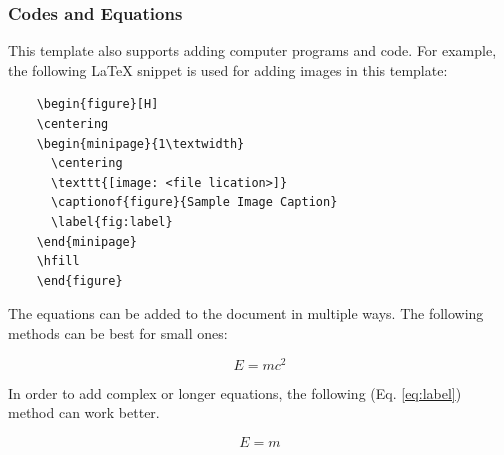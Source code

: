 \subsubsection{Codes and Equations}

This template also supports adding computer programs and code. For example, the following \LaTeX \cite{goossens1994latex} snippet is used for adding images in this template: \\

\begin{lstlisting}
    \begin{figure}[H]
    \centering
    \begin{minipage}{1\textwidth}
      \centering
      \texttt{[image: <file lication>]}
      \captionof{figure}{Sample Image Caption}
      \label{fig:label}
    \end{minipage}
    \hfill
    \end{figure}
\end{lstlisting}


The equations can be added to the document in multiple ways. The following methods can be best for small ones:

\[E=mc^2\]

In order to add complex or longer equations, the following (Eq. \ref{eq:label}) method can work better.

\begin{equation}
E=m
\label{eq:label}
\end{equation}
